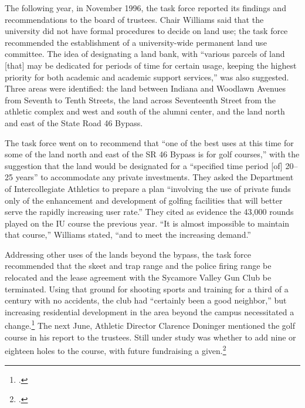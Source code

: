 \documentclass[
  american,
  letterpaper,
]{scrreprt}
\begin{document}
The following year, in November 1996, the task force reported its
findings and recommendations to the board of trustees. Chair Williams
said that the university did not have formal procedures to decide on
land use; the task force recommended the establishment of a
university-wide permanent land use committee. The idea of designating a
land bank, with ``various parcels of land {[}that{]} may be dedicated
for periods of time for certain usage, keeping the highest priority for
both academic and academic support services,'' was also suggested. Three
areas were identified: the land between Indiana and Woodlawn Avenues
from Seventh to Tenth Streets, the land across Seventeenth Street from
the athletic complex and west and south of the alumni center, and the
land north and east of the State Road 46 Bypass.

The task force went on to recommend that ``one of the best uses at this
time for some of the land north and east of the SR 46 Bypass is for golf
courses,'' with the suggestion that the land would be designated for a
``specified time period {[}of{]} 20--25 years'' to accommodate any
private investments. They asked the Department of Intercollegiate
Athletics to prepare a plan ``involving the use of private funds only of
the enhancement and development of golfing facilities that will better
serve the rapidly increasing user rate.'' They cited as evidence the
43,000 rounds played on the IU course the previous year. ``It is almost
impossible to maintain that course,'' Williams stated, ``and to meet the
increasing demand.''

Addressing other uses of the lands beyond the bypass, the task force
recommended that the skeet and trap range and the police firing range be
relocated and the lease agreement with the Sycamore Valley Gun Club be
terminated. Using that ground for shooting sports and training for a
third of a century with no accidents, the club had ``certainly been a
good neighbor,'' but increasing residential development in the area
beyond the campus necessitated a change.\footnote{.}
The next June, Athletic Director Clarence Doninger mentioned the golf
course in his report to the trustees. Still under study was whether to
add nine or eighteen holes to the course, with future fundraising a
given.\footnote{.}
\end{document}
